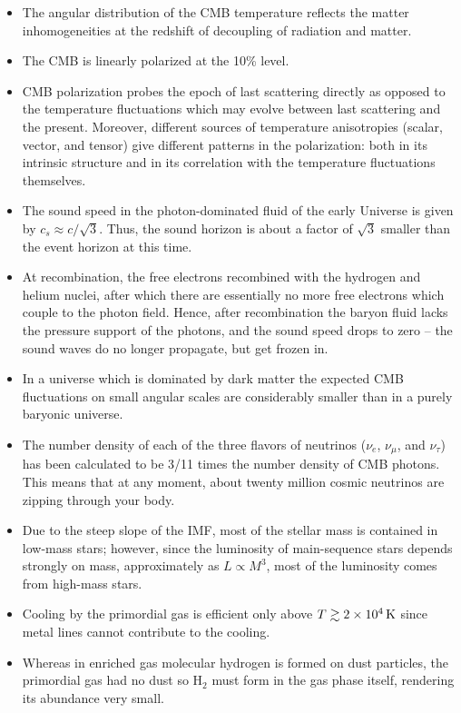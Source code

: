 \documentclass[a4paper,10pt]{article}
\begin{document}
\begin{itemize}
    \item The angular distribution of the CMB temperature reflects the matter inhomogeneities at the redshift of decoupling of radiation and matter.
    \item The CMB is linearly polarized at the 10\% level.
    \item CMB polarization probes the epoch of last scattering directly as opposed to the temperature fluctuations which may evolve between last scattering and the present. Moreover, different sources of temperature anisotropies (scalar, vector, and tensor) give different patterns in the polarization: both in its intrinsic structure and in its correlation with the temperature fluctuations themselves.
    \item The sound speed in the photon-dominated fluid of the early Universe is given by $c_s\approx c/\sqrt{3}$. Thus, the sound horizon is about a factor of $\sqrt{3}$ smaller than the event horizon at this time.
    \item At recombination, the free electrons recombined with the hydrogen and helium nuclei, after which there are essentially no more free electrons which couple to the photon field. Hence, after recombination the baryon fluid lacks the pressure support of the photons, and the sound speed drops to zero -- the sound waves do no longer propagate, but get frozen in.
    \item In a universe which is dominated by dark matter the expected CMB fluctuations on small angular scales are considerably smaller than in a purely baryonic universe.
    \item The number density of each of the three flavors of neutrinos ($\nu_e$, $\nu_\mu$, and $\nu_\tau$) has been calculated to be 3/11 times the number density of CMB photons. This means that at any moment, about twenty million cosmic neutrinos are zipping through your body.
    \item Due to the steep slope of the IMF, most of the stellar mass is contained in low-mass stars; however, since the luminosity of main-sequence stars depends strongly on mass, approximately as $L\propto M^3$, most of the luminosity comes from high-mass stars.
    \item Cooling by the primordial gas is efficient only above $T\gtrsim2\times10^4\,{\rm K}$ since metal lines cannot contribute to the cooling.
    \item Whereas in enriched gas molecular hydrogen is formed on dust particles, the primordial gas had no dust so H$_2$ must form in the gas phase itself, rendering its abundance very small.

\end{itemize}
\end{document}
